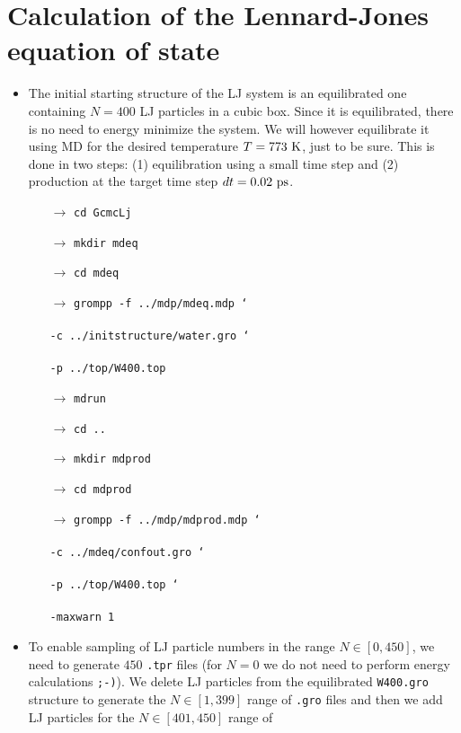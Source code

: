 \documentclass[fleqn,a4paper,12pt]{article}
\begin{document}
\section{Calculation of the Lennard-Jones equation of state}
\begin{itemize}
  	\item The initial starting structure of the LJ system is an equilibrated one
  	containing $N=400$ LJ particles in a cubic box. Since it is equilibrated,
  	there is no need to energy minimize the system. We will however equilibrate it using
  	MD for the desired temperature $T=773~\rm K$, just to be sure. This is done
  	in two steps: (1) equilibration using a small time step and (2) production at
  	the target time step $dt=0.02~\rm ps$.
  	\begin{itemize}
  		\item[$\to$] {\tt cd GcmcLj}
  		\item[$\to$] {\tt mkdir mdeq}
  		\item[$\to$] {\tt cd mdeq}
  		\item[$\to$] {\tt grompp -f ../mdp/mdeq.mdp \char`\\}\\
  					 {\tt -c ../initstructure/water.gro \char`\\}\\
  					 {\tt -p ../top/W400.top}
  		\item[$\to$] {\tt mdrun}
  		\item[$\to$] {\tt cd ..}
  		\item[$\to$] {\tt mkdir mdprod}
  		\item[$\to$] {\tt cd mdprod}
  		\item[$\to$] {\tt grompp -f ../mdp/mdprod.mdp \char`\\}\\
  					 {\tt -c ../mdeq/confout.gro \char`\\}\\
  					 {\tt -p ../top/W400.top \char`\\}\\
  					 {\tt -maxwarn 1}
  	\end{itemize}
  	\item To enable sampling of LJ particle numbers in the range $N\in [0,450]$,
  	we need to generate $450$ {\tt .tpr} files (for $N=0$ we do not need to
  	perform energy calculations {\tt ;-)}). We delete LJ particles from the equilibrated
  	{\tt W400.gro} structure to generate the $N\in [1,399]$ range of {\tt .gro}
  	files and then we add LJ particles for the $N\in [401,450]$ range of {\tt
}
\end{itemize}
\end{document}

